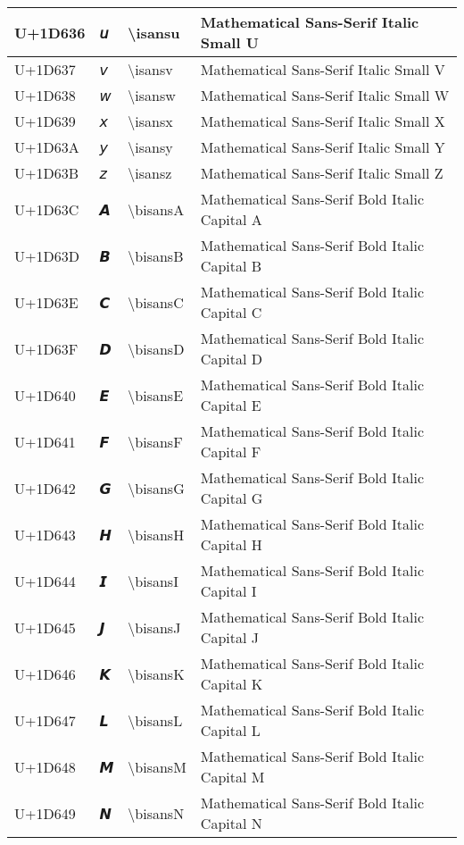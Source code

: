 \begin{table}[h]
\begin{tabulary}{\linewidth}{|L|L|L|L|}
\hline
U+1D636 & 𝘶 & {\textbackslash}isansu & Mathematical Sans-Serif Italic Small U \\
\hline
U+1D637 & 𝘷 & {\textbackslash}isansv & Mathematical Sans-Serif Italic Small V \\
\hline
U+1D638 & 𝘸 & {\textbackslash}isansw & Mathematical Sans-Serif Italic Small W \\
\hline
U+1D639 & 𝘹 & {\textbackslash}isansx & Mathematical Sans-Serif Italic Small X \\
\hline
U+1D63A & 𝘺 & {\textbackslash}isansy & Mathematical Sans-Serif Italic Small Y \\
\hline
U+1D63B & 𝘻 & {\textbackslash}isansz & Mathematical Sans-Serif Italic Small Z \\
\hline
U+1D63C & 𝘼 & {\textbackslash}bisansA & Mathematical Sans-Serif Bold Italic Capital A \\
\hline
U+1D63D & 𝘽 & {\textbackslash}bisansB & Mathematical Sans-Serif Bold Italic Capital B \\
\hline
U+1D63E & 𝘾 & {\textbackslash}bisansC & Mathematical Sans-Serif Bold Italic Capital C \\
\hline
U+1D63F & 𝘿 & {\textbackslash}bisansD & Mathematical Sans-Serif Bold Italic Capital D \\
\hline
U+1D640 & 𝙀 & {\textbackslash}bisansE & Mathematical Sans-Serif Bold Italic Capital E \\
\hline
U+1D641 & 𝙁 & {\textbackslash}bisansF & Mathematical Sans-Serif Bold Italic Capital F \\
\hline
U+1D642 & 𝙂 & {\textbackslash}bisansG & Mathematical Sans-Serif Bold Italic Capital G \\
\hline
U+1D643 & 𝙃 & {\textbackslash}bisansH & Mathematical Sans-Serif Bold Italic Capital H \\
\hline
U+1D644 & 𝙄 & {\textbackslash}bisansI & Mathematical Sans-Serif Bold Italic Capital I \\
\hline
U+1D645 & 𝙅 & {\textbackslash}bisansJ & Mathematical Sans-Serif Bold Italic Capital J \\
\hline
U+1D646 & 𝙆 & {\textbackslash}bisansK & Mathematical Sans-Serif Bold Italic Capital K \\
\hline
U+1D647 & 𝙇 & {\textbackslash}bisansL & Mathematical Sans-Serif Bold Italic Capital L \\
\hline
U+1D648 & 𝙈 & {\textbackslash}bisansM & Mathematical Sans-Serif Bold Italic Capital M \\
\hline
U+1D649 & 𝙉 & {\textbackslash}bisansN & Mathematical Sans-Serif Bold Italic Capital N \\

\end{tabulary}
\end{table}
